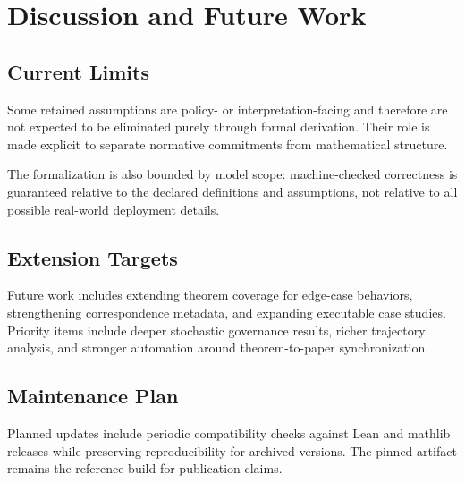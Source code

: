 \section{Discussion and Future Work}

\subsection{Current Limits}

Some retained assumptions are policy- or interpretation-facing and therefore are
not expected to be eliminated purely through formal derivation. Their role is
made explicit to separate normative commitments from mathematical structure.

The formalization is also bounded by model scope: machine-checked correctness is
guaranteed relative to the declared definitions and assumptions, not relative to
all possible real-world deployment details.

\subsection{Extension Targets}

Future work includes extending theorem coverage for edge-case behaviors,
strengthening correspondence metadata, and expanding executable case studies.
Priority items include deeper stochastic governance results, richer trajectory
analysis, and stronger automation around theorem-to-paper synchronization.

\subsection{Maintenance Plan}

Planned updates include periodic compatibility checks against Lean and mathlib
releases while preserving reproducibility for archived versions. The pinned
artifact remains the reference build for publication claims.
